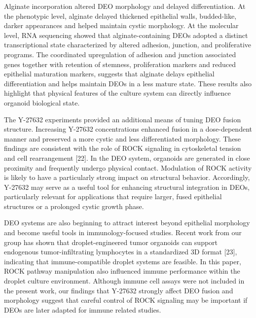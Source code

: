 \documentclass[
]{article}
\begin{document}
Alginate incorporation altered DEO morphology and delayed differentiation. At the phenotypic level, alginate delayed thickened epithelial walls, budded-like, darker appearances and helped maintain cystic morphology. At the molecular level, RNA sequencing showed that alginate-containing DEOs adopted a distinct transcriptional state characterized by altered adhesion, junction, and proliferative programs. The coordinated upregulation of adhesion and junction associated genes together with retention of stemness, proliferation markers and reduced epithelial maturation markers, suggests that alginate delays epithelial differentiation and helps maintain DEOs in a less mature state. These results also highlight that physical features of the culture system can directly influence organoid biological state.

The Y-27632 experiments provided an additional means of tuning DEO fusion structure. Increasing Y-27632 concentrations enhanced fusion in a dose-dependent manner and preserved a more cystic and less differentiated morphology. These findings are consistent with the role of ROCK signaling in cytoskeletal tension and cell rearrangement {[}22{]}. In the DEO system, organoids are generated in close proximity and frequently undergo physical contact. Modulation of ROCK activity is likely to have a particularly strong impact on structural behavior. Accordingly, Y-27632 may serve as a useful tool for enhancing structural integration in DEOs, particularly relevant for applications that require larger, fused epithelial structures or a prolonged cystic growth phase.

DEO systems are also beginning to attract interest beyond epithelial morphology and become useful tools in immunology-focused studies. Recent work from our group has shown that droplet-engineered tumor organoids can support endogenous tumor-infiltrating lymphocytes in a standardized 3D format {[}23{]}, indicating that immune-compatible droplet systems are feasible. In this paper, ROCK pathway manipulation also influenced immune performance within the droplet culture environment. Although immune cell assays were not included in the present work, our findings that Y-27632 strongly affect DEO fusion and morphology suggest that careful control of ROCK signaling may be important if DEOs are later adapted for immune related studies.
\end{document}
